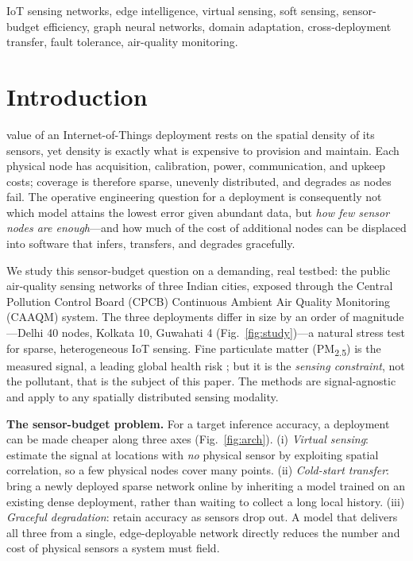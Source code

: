 \documentclass[journal]{IEEEtran}
\newcommand{\pmf}{PM\textsubscript{2.5}\xspace}
\begin{document}
\begin{IEEEkeywords}
IoT sensing networks, edge intelligence, virtual sensing, soft sensing, sensor-budget efficiency, graph neural networks, domain adaptation, cross-deployment transfer, fault tolerance, air-quality monitoring.
\end{IEEEkeywords}

\section{Introduction}
 value of an Internet-of-Things deployment rests on the spatial density of its sensors, yet density is exactly what is expensive to provision and maintain. Each physical node has acquisition, calibration, power, communication, and upkeep costs; coverage is therefore sparse, unevenly distributed, and degrades as nodes fail. The operative engineering question for a deployment is consequently not which model attains the lowest error given abundant data, but \emph{how few sensor nodes are enough}---and how much of the cost of additional nodes can be displaced into software that infers, transfers, and degrades gracefully.

We study this sensor-budget question on a demanding, real testbed: the public air-quality sensing networks of three Indian cities, exposed through the Central Pollution Control Board (CPCB) Continuous Ambient Air Quality Monitoring (CAAQM) system. The three deployments differ in size by an order of magnitude---Delhi 40 nodes, Kolkata 10, Guwahati 4 (Fig.~\ref{fig:study})---a natural stress test for sparse, heterogeneous IoT sensing. Fine particulate matter (\pmf) is the measured signal, a leading global health risk \cite{hei2024,who2021}; but it is the \emph{sensing constraint}, not the pollutant, that is the subject of this paper. The methods are signal-agnostic and apply to any spatially distributed sensing modality.

\textbf{The sensor-budget problem.} For a target inference accuracy, a deployment can be made cheaper along three axes (Fig.~\ref{fig:arch}). (i) \emph{Virtual sensing}: estimate the signal at locations with \emph{no} physical sensor by exploiting spatial correlation, so a few physical nodes cover many points. (ii) \emph{Cold-start transfer}: bring a newly deployed sparse network online by inheriting a model trained on an existing dense deployment, rather than waiting to collect a long local history. (iii) \emph{Graceful degradation}: retain accuracy as sensors drop out. A model that delivers all three from a single, edge-deployable network directly reduces the number and cost of physical sensors a system must field.
\end{document}
